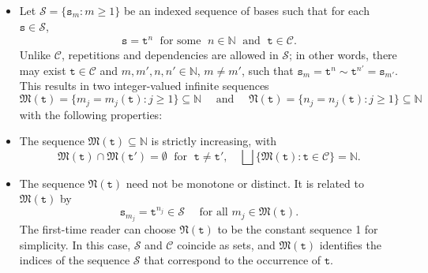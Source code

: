 \documentclass[12pt, twoside]{article}
\theoremstyle{definition}
\numberwithin{equation}{section}
\begin{document}
\begin{itemize}
	\item Let $\mathcal S = \{\mathtt s_m : m \geq 1\}$ be an indexed sequence of bases such that for each $\mathtt s \in \mathcal S$, 
		\begin{align}\label{s-condition-plus}
			\mathtt s = \mathtt{t}^n \; \text{ for some } \; n \in \mathbb{N} \; \text{ and } \; \mathtt t \in \mathscr{C}.
		\end{align} 
	Unlike $\mathscr{C}$, repetitions and dependencies are allowed in $\mathcal S$; in other words, there may exist $\mathtt t \in \mathscr{C}$ and $m, m', n, n' \in \mathbb N$, $m \ne m'$, such that $\mathtt s_m = \mathtt t^n \sim \mathtt t^{n'} = \mathtt s_{m'}$. This results in two integer-valued infinite sequences 
	\[ \mathfrak M(\mathtt t) = \{m_j = m_j(\mathtt t) : j \geq 1\} \subseteq \mathbb N \quad \text{ and } \quad \mathfrak N(\mathtt t) = \{n_j = n_j(\mathtt t) : j \geq 1 \} \subseteq \mathbb N \] with the following properties:
	\item The sequence $\mathfrak M(\mathtt t) \subseteq \mathbb N$ is strictly increasing, with
		\begin{equation} 
			\mathfrak M(\mathtt t) \cap \mathfrak M(\mathtt t') = \emptyset \; \text{ for } \; \mathtt t \ne \mathtt t', \quad \bigsqcup \bigl\{\mathfrak M(\mathtt t) : \mathtt t \in \mathscr{C} \bigr\} = \mathbb N.  \label{s-condition-0}
		\end{equation} 
	\item The sequence $\mathfrak N(\mathtt t)$ need not be monotone or distinct. It is related to $\mathfrak M(\mathtt t)$ by
		\begin{equation} 
			\mathtt s_{m_j} = \mathtt t^{n_j} \in \mathcal S \quad \text{ for all } m_j \in \mathfrak M(\mathtt t). \label{M-and-N} 
		\end{equation}  The first-time reader can choose $\mathfrak N(\mathtt t)$ to be the constant sequence 1 for simplicity. In this case, $\mathcal S$ and $\mathscr{C}$ coincide as sets, and $\mathfrak M(\mathtt t)$ identifies the indices of the sequence $\mathcal S$ that correspond to the occurrence of $\mathtt t$.     
	

\end{itemize}
\end{document}
